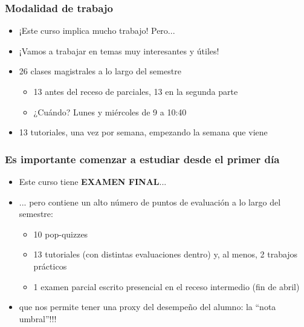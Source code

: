 \documentclass{beamer}
\begin{document}
\begin{frame}
\frametitle{Modalidad de trabajo}
\begin{itemize}
    \item ¡Este curso implica mucho trabajo! Pero...  \vspace{2mm}
    \item ¡Vamos a trabajar en temas muy interesantes y útiles!  \vspace{2mm}
    \item 26 clases magistrales a lo largo del semestre 
\begin{itemize}
        \item 13 antes del receso de parciales, 13 en la segunda parte
        \item ¿Cuándo? Lunes y miércoles de 9 a 10:40
        \end{itemize}
    \item 13 tutoriales, una vez por semana, empezando la semana que viene 
\end{itemize}
\end{frame}

\begin{frame}
\frametitle{Es importante comenzar a estudiar desde el primer día}
\begin{itemize}
    \item Este curso tiene \textbf{EXAMEN FINAL}... \vspace{2mm}
    \item ... pero contiene un alto número de puntos de evaluación a lo largo del semestre:
        \begin{itemize}
            \item 10 pop-quizzes
            \item 13 tutoriales (con distintas evaluaciones dentro) y, al menos, 2 trabajos prácticos
            \item 1 examen parcial escrito presencial en el receso intermedio (fin de abril)
        \end{itemize} \vspace{2mm}
    \item que nos permite tener una proxy del desempeño del alumno: la ``nota umbral''!!!
    \end{itemize}
\end{frame}
\end{document}
